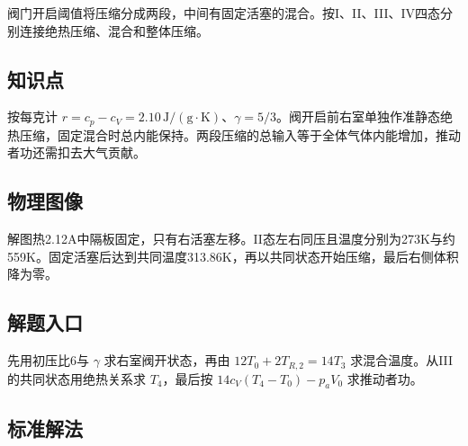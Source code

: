 \documentclass[UTF8,fontset=fandol,a4paper,11pt]{ctexart}
\begin{document}
阀门开启阈值将压缩分成两段，中间有固定活塞的混合。按I、II、III、IV四态分别连接绝热压缩、混合和整体压缩。



\subsection*{知识点}

按每克计 $r=c_p-c_V=2.10\,\mathrm{J/(g\cdot K)}$、$\gamma=5/3$。阀开启前右室单独作准静态绝热压缩，固定混合时总内能保持。两段压缩的总输入等于全体气体内能增加，推动者功还需扣去大气贡献。




\subsection*{物理图像}

解图热2.12A中隔板固定，只有右活塞左移。II态左右同压且温度分别为273K与约559K。固定活塞后达到共同温度313.86K，再以共同状态开始压缩，最后右侧体积降为零。



\subsection*{解题入口}

先用初压比6与 $\gamma$ 求右室阀开状态，再由 $12T_0+2T_{R,2}=14T_3$ 求混合温度。从III的共同状态用绝热关系求 $T_4$，最后按 $14c_V(T_4-T_0)-p_aV_0$ 求推动者功。




\subsection*{标准解法}
\end{document}
